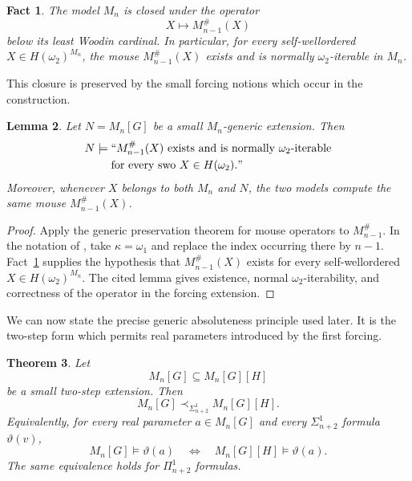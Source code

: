 \documentclass[a4paper,11pt]{article}
\newtheorem{theorem}{Theorem}[section]
\newtheorem{lemma}[theorem]{Lemma}
\newtheorem{fact}[theorem]{Fact}
\begin{document}
\begin{fact}
\label{fact-Mn-closure-under-lower-mouse-operator}
The model $M_n$ is closed under the operator
\[
   X\longmapsto M_{n-1}^{\#}(X)
\]
below its least Woodin cardinal.  In particular, for every self-wellordered
$X\in H(\omega_2)^{M_n}$, the mouse $M_{n-1}^{\#}(X)$ exists and is normally
$\omega_2$-iterable in $M_n$.
\end{fact}

This closure is preserved by the small forcing notions which occur in the
construction.

\begin{lemma}
\label{lemma-small-forcing-preserves-lower-mouse-operator}
Let $N=M_n[G]$ be a small $M_n$-generic extension.  Then
\[
\begin{aligned}
   N\models{}&``M_{n-1}^{\#}(X)\text{ exists and is normally }
      \omega_2\text{-iterable}\\
   &\text{for every swo }X\in H(\omega_2)."
\end{aligned}
\]
Moreover, whenever $X$ belongs to both $M_n$ and $N$, the two models compute
the same mouse $M_{n-1}^{\#}(X)$.
\end{lemma}

\begin{proof}
Apply the generic preservation theorem for mouse operators to
$M_{n-1}^{\#}$.  In the notation of \cite[Lemma~3.4]{Schlicht}, take
$\kappa=\omega_1$ and replace the index occurring there by $n-1$.
Fact~\ref{fact-Mn-closure-under-lower-mouse-operator} supplies the hypothesis
that $M_{n-1}^{\#}(X)$ exists for every self-wellordered
$X\in H(\omega_2)^{M_n}$.  The cited lemma gives existence, normal
$\omega_2$-iterability, and correctness of the operator in the forcing
extension.
\end{proof}

We can now state the precise generic absoluteness principle used later.  It is
the two-step form which permits real parameters introduced by the first
forcing.

\begin{theorem}
\label{theorem-small-two-step-projective-absoluteness}
Let
\[
   M_n[G]\subseteq M_n[G][H]
\]
be a small two-step extension.  Then
\[
   M_n[G]\prec_{\Sigma^1_{n+2}} M_n[G][H].
\]
Equivalently, for every real parameter $a\in M_n[G]$ and every
$\Sigma^1_{n+2}$ formula $\vartheta(v)$,
\[
   M_n[G]\models\vartheta(a)
   \quad\Longleftrightarrow\quad
   M_n[G][H]\models\vartheta(a).
\]
The same equivalence holds for $\Pi^1_{n+2}$ formulas.
\end{theorem}
\end{document}
